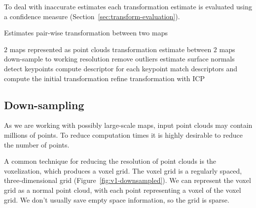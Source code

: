 To deal with inaccurate estimates each transformation estimate is evaluated using a confidence measure (Section~\ref{sec:transform-evaluation}).

\begin{algorithm}
    \caption[Pair-wise transformation estimation]{Estimates pair-wise transformation between two maps}
    \label{alg:estimate-pair}
    \begin{algorithmic}[1]
        \Require $2$ maps represented as point clouds
        \Ensure transformation estimate between $2$ maps
            \State down-sample to working resolution
            \State remove outliers
            \State estimate surface normals
            \State detect keypoints
            \State compute descriptor for each keypoint
            \State match descriptors and compute the initial transformation
            \State refine transformation with \gls{ICP}
        \EndProcedure
    \end{algorithmic}
\end{algorithm}

\subsection{Down-sampling}
\label{sec:downsampling}

As we are working with possibly large-scale maps, input point clouds may contain millions of points. To reduce computation times it is highly desirable to reduce the number of points.

A common technique for reducing the resolution of point clouds is the voxelization, which produces a voxel grid. The voxel grid is a regularly spaced, three-dimensional grid (Figure~\ref{fig:v1-downsampled}). We can represent the voxel grid as a normal point cloud, with each point representing a voxel of the voxel grid. We don't usually save empty space information, so the grid is sparse.

